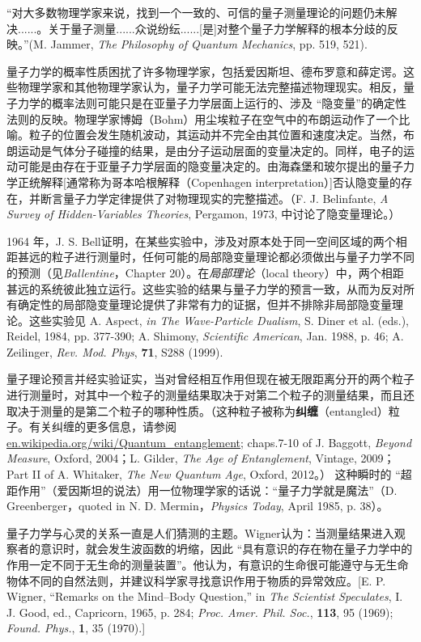     “对大多数物理学家来说，找到一个一致的、可信的量子测量理论的问题仍未解决......。关于量子测量......众说纷纭......[是]对整个量子力学解释的根本分歧的反映。”(M. Jammer, \textit{The Philosophy of Quantum Mechanics}, pp. 519, 521).

    量子力学的概率性质困扰了许多物理学家，包括爱因斯坦、德布罗意和薛定谔。这些物理学家和其他物理学家认为，量子力学可能无法完整描述物理现实。相反，量子力学的概率法则可能只是在亚量子力学层面上运行的、涉及 “隐变量”的确定性法则的反映。物理学家博姆（Bohm）用尘埃粒子在空气中的布朗运动作了一个比喻。粒子的位置会发生随机波动，其运动并不完全由其位置和速度决定。当然，布朗运动是气体分子碰撞的结果，是由分子运动层面的变量决定的。同样，电子的运动可能是由存在于亚量子力学层面的隐变量决定的。由海森堡和玻尔提出的量子力学正统解释[通常称为哥本哈根解释（Copenhagen interpretation）]否认隐变量的存在，并断言量子力学定律提供了对物理现实的完整描述。（F. J. Belinfante, \textit{A Survey of  Hidden-Variables Theories}, Pergamon, 1973, 中讨论了隐变量理论。）

    1964 年，J. S. Bell证明，在某些实验中，涉及对原本处于同一空间区域的两个相距甚远的粒子进行测量时，任何可能的局部隐变量理论都必须做出与量子力学不同的预测（见\textit{Ballentine}，Chapter 20）。在\textit{局部理论}（local theory）中，两个相距甚远的系统彼此独立运行。这些实验的结果与量子力学的预言一致，从而为反对所有确定性的局部隐变量理论提供了非常有力的证据，但并不排除非局部隐变量理论。这些实验见 A. Aspect, \textit{in The Wave-Particle Dualism}, S. Diner et al. (eds.), Reidel, 1984, pp. 377-390; A. Shimony, \textit{Scientific American}, Jan. 1988, p. 46; A. Zeilinger, \textit{Rev. Mod. Phys}, \textbf{71}, S288 (1999).

    量子理论预言并经实验证实，当对曾经相互作用但现在被无限距离分开的两个粒子进行测量时，对其中一个粒子的测量结果取决于对第二个粒子的测量结果，而且还取决于测量的是第二个粒子的哪种性质。（这种粒子被称为\textbf{纠缠}（entangled）粒子。有关纠缠的更多信息，请参阅 \url{en.wikipedia.org/wiki/Quantum_entanglement}; chaps.7-10 of J. Baggott, \textit{Beyond Measure}, Oxford, 2004；L. Gilder, \textit{The Age of Entanglement}, Vintage, 2009；Part II of A. Whitaker, \textit{The New Quantum Age}, Oxford, 2012。） 这种瞬时的 “超距作用”（爱因斯坦的说法）用一位物理学家的话说：“量子力学就是魔法”（D. Greenberger，quoted in N. D. Mermin，\textit{Physics Today}, April 1985, p. 38）。

    量子力学与心灵的关系一直是人们猜测的主题。Wigner认为：当测量结果进入观察者的意识时，就会发生波函数的坍缩，因此 “具有意识的存在物在量子力学中的作用一定不同于无生命的测量装置”。他认为，有意识的生命很可能遵守与无生命物体不同的自然法则，并建议科学家寻找意识作用于物质的异常效应。[E. P. Wigner, “Remarks on the Mind–Body Question,” in \textit{The Scientist Speculates}, I. J. Good, ed., Capricorn, 1965, p. 284; \textit{Proc. Amer. Phil. Soc.}, \textbf{113}, 95 (1969); \textit{Found. Phys.}, \textbf{1}, 35 (1970).]

